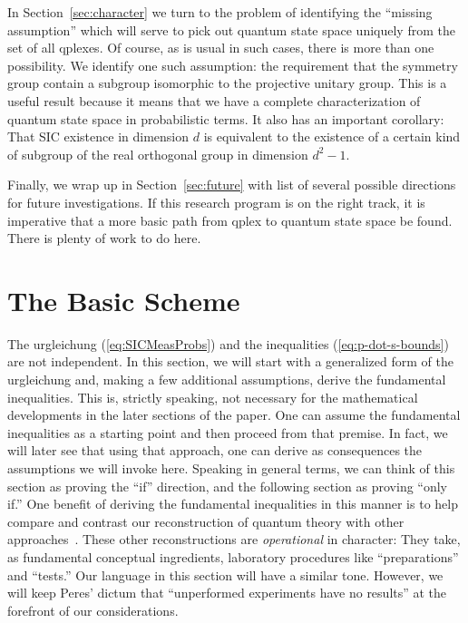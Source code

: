 \documentclass[aps,pra,superscriptaddress,10pt,tightenlines,twocolumn,nofootinbib]{revtex4}
\theoremstyle{remark}
\newcommand{\qplexes}{qplexes}
\begin{document}
In Section~\ref{sec:character} we turn to the problem of identifying the ``missing assumption'' which will serve to pick out quantum state space uniquely from the set of all \qplexes.  Of course, as is usual in such cases, there is more than one possibility.  We identify one such assumption:  the requirement that the symmetry group contain a subgroup isomorphic to the projective unitary group.  This is a useful result because it means that we have a complete characterization of quantum state space in probabilistic terms.  It also has an important corollary:  That SIC existence in dimension $d$ is equivalent to the existence of a certain kind of subgroup of the real orthogonal group in dimension $d^2-1$.

Finally, we wrap up in Section~\ref{sec:future} with list of several possible directions for future investigations.  If this research program is on the right track, it is imperative that a more basic path from qplex to quantum state space be found.  There is plenty of work to do here.

\section{The Basic Scheme}
\label{sec:basic}
The urgleichung (\ref{eq:SICMeasProbs}) and the inequalities
(\ref{eq:p-dot-s-bounds}) are not independent.  In this section, we
will start with a generalized form of the urgleichung and, making a
few additional assumptions, derive the fundamental inequalities.  This
is, strictly speaking, not necessary for the mathematical developments
in the later sections of the paper.  One can assume the fundamental
inequalities as a starting point and then proceed from that premise.
In fact, we will later see that using that approach, one can derive as
consequences the assumptions we will invoke here.  Speaking in general
terms, we can think of this section as proving the ``if'' direction,
and the following section as proving ``only if.''  One benefit of
deriving the fundamental inequalities in this manner is to help
compare and contrast our reconstruction of quantum theory with other
approaches~\cite{transcript, coecke2016, HoehnWever, Masanes, Hardy01,
  Schack03, Barnum}.  These other reconstructions are
\emph{operational} in character: They take, as fundamental conceptual
ingredients, laboratory procedures like ``preparations'' and
``tests.''  Our language in this section will have a similar tone.
However, we will keep Peres' dictum that ``unperformed experiments
have no results'' at the forefront of our considerations.
\end{document}
